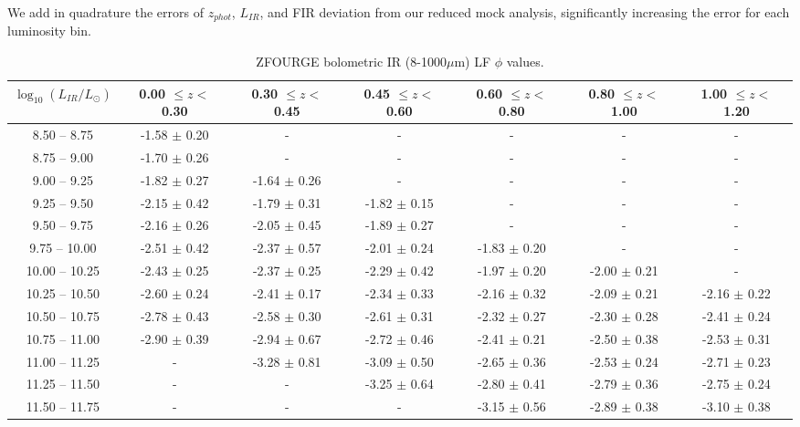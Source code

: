 We add in quadrature the errors of $z_{phot}$, $L_{IR}$, and FIR deviation from our reduced mock analysis, significantly increasing the error for each luminosity bin.

\begin{table*}
    \begin{center}
    \caption{ZFOURGE bolometric IR (8-1000$\mu$m) LF $\phi$ values.}
    \label{Tab: ZF LF}
    \begin{tabular}{@{}ccccccc@{}}
        \toprule
        $\log_{10}(L_{IR}/L_{\odot})$ & 0.00 $\leq z <$ 0.30 & 0.30 $\leq z <$ 0.45 & 0.45 $\leq z <$ 0.60 & 0.60 $\leq z <$ 0.80 & 0.80 $\leq z <$ 1.00 & 1.00 $\leq z <$ 1.20 \\
        \hline
         8.50 --  8.75 & -1.58 $\pm$ 0.20 & - & - & - & - & - \\
         8.75 --  9.00 & -1.70 $\pm$ 0.26 & - & - & - & - & - \\
         9.00 --  9.25 & -1.82 $\pm$ 0.27 & -1.64 $\pm$ 0.26 & - & - & - & - \\
         9.25 --  9.50 & -2.15 $\pm$ 0.42 & -1.79 $\pm$ 0.31 & -1.82 $\pm$ 0.15 & - & - & - \\
         9.50 --  9.75 & -2.16 $\pm$ 0.26 & -2.05 $\pm$ 0.45 & -1.89 $\pm$ 0.27 & - & - & - \\
         9.75 -- 10.00 & -2.51 $\pm$ 0.42 & -2.37 $\pm$ 0.57 & -2.01 $\pm$ 0.24 & -1.83 $\pm$ 0.20 & - & - \\
        10.00 -- 10.25 & -2.43 $\pm$ 0.25 & -2.37 $\pm$ 0.25 & -2.29 $\pm$ 0.42 & -1.97 $\pm$ 0.20 & -2.00 $\pm$ 0.21 & - \\
        10.25 -- 10.50 & -2.60 $\pm$ 0.24 & -2.41 $\pm$ 0.17 & -2.34 $\pm$ 0.33 & -2.16 $\pm$ 0.32 & -2.09 $\pm$ 0.21 & -2.16 $\pm$ 0.22 \\
        10.50 -- 10.75 & -2.78 $\pm$ 0.43 & -2.58 $\pm$ 0.30 & -2.61 $\pm$ 0.31 & -2.32 $\pm$ 0.27 & -2.30 $\pm$ 0.28 & -2.41 $\pm$ 0.24 \\
        10.75 -- 11.00 & -2.90 $\pm$ 0.39 & -2.94 $\pm$ 0.67 & -2.72 $\pm$ 0.46 & -2.41 $\pm$ 0.21 & -2.50 $\pm$ 0.38 & -2.53 $\pm$ 0.31 \\
        11.00 -- 11.25 & -                & -3.28 $\pm$ 0.81 & -3.09 $\pm$ 0.50 & -2.65 $\pm$ 0.36 & -2.53 $\pm$ 0.24 & -2.71 $\pm$ 0.23 \\
        11.25 -- 11.50 & -                & -                & -3.25 $\pm$ 0.64 & -2.80 $\pm$ 0.41 & -2.79 $\pm$ 0.36 & -2.75 $\pm$ 0.24 \\
        11.50 -- 11.75 & -                & -                & -                & -3.15 $\pm$ 0.56 & -2.89 $\pm$ 0.38 & -3.10 $\pm$ 0.38 \\

\end{tabular}
\end{center}
\end{table*}
